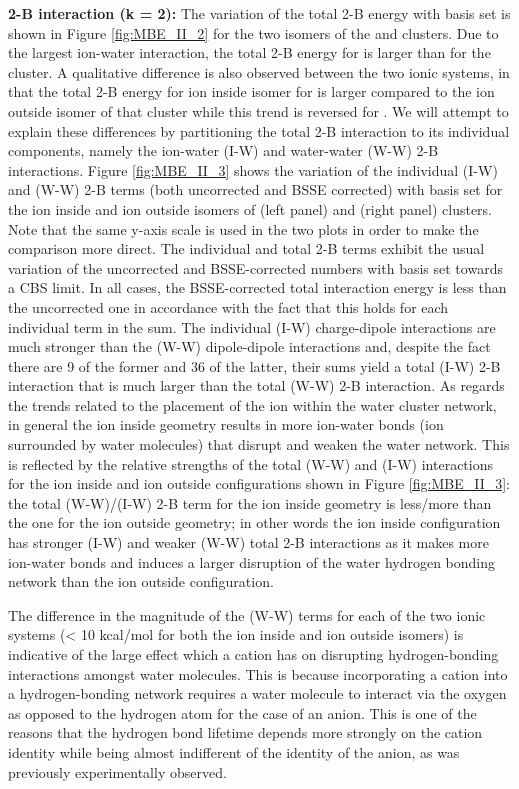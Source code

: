 \documentclass[11pt, proquest]{uwthesis}[2020/02/24]
\let\ce\ch
\begin{document}
\textbf{2-B interaction (k = 2):} The variation of the total 2-B energy with basis set is shown in Figure \ref{fig:MBE_II_2} for the two isomers of the \ce{Li^+(H2O)9} and \ce{Cl^-(H2O)9} clusters. Due to the largest ion-water interaction, the total 2-B energy for \ce{Li^+(H2O)9} is larger than for the \ce{Cl^-(H2O)9} cluster. A qualitative difference is also observed between the two ionic systems, in that the total 2-B energy for ion inside isomer for \ce{Li^+(H2O)9} is larger compared to the ion outside isomer of that cluster while this trend is reversed for \ce{Cl^-(H2O)9}. We will attempt to explain these differences by partitioning the total 2-B interaction to its individual components, namely the ion-water (I-W) and water-water (W-W) 2-B interactions. Figure \ref{fig:MBE_II_3} shows the variation of the individual (I-W) and (W-W) 2-B terms (both uncorrected and BSSE corrected) with basis set for the ion inside and ion outside isomers of \ce{Li^+(H2O)9} (left panel) and \ce{Cl^-(H2O)9} (right panel) clusters. Note that the same y-axis scale is used in the two plots in order to make the comparison more direct. The individual and total 2-B terms exhibit the usual variation of the uncorrected and BSSE-corrected numbers with basis set towards a CBS limit. In all cases, the BSSE-corrected total interaction energy is less than the uncorrected one in accordance with the fact that this holds for each individual term in the sum. The individual (I-W) charge-dipole interactions are much stronger than the (W-W) dipole-dipole interactions and, despite the fact there are 9 of the former and 36 of the latter, their sums yield a total (I-W) 2-B interaction that is much larger than the total (W-W) 2-B interaction. As regards the trends related to the placement of the ion within the water cluster network, in general the ion inside geometry results in more ion-water bonds (ion surrounded by water molecules) that disrupt and weaken the water network. This is reflected by the relative strengths of the total (W-W) and (I-W) interactions for the ion inside and ion outside configurations shown in Figure \ref{fig:MBE_II_3}: the total (W-W)/(I-W) 2-B term for the ion inside geometry is less/more than the one for the ion outside geometry; in other words the ion inside configuration has stronger (I-W) and weaker (W-W) total 2-B interactions as it makes more ion-water bonds and induces a larger disruption of the water hydrogen bonding network than the ion outside configuration.

\par The difference in the magnitude of the (W-W) terms for each of the two ionic systems (< 10 kcal/mol for both the ion inside and ion outside isomers) is indicative of the large effect which a cation has on disrupting hydrogen-bonding interactions amongst water molecules. This is because incorporating a cation into a hydrogen-bonding network requires a water molecule to interact via the oxygen as opposed to the hydrogen atom for the case of an anion. This is one of the reasons that the hydrogen bond lifetime depends more strongly on the cation identity while being almost indifferent of the identity of the anion, as was previously experimentally observed.\autocite{shalit_terahertz_2017}
\end{document}
